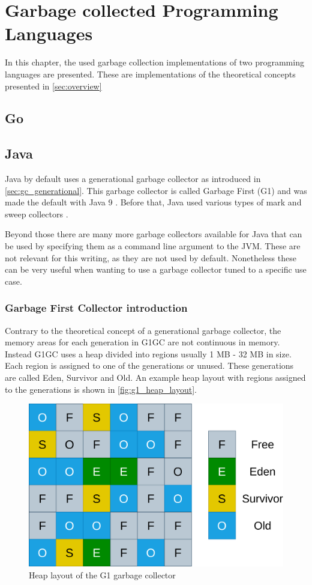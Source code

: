 \chapter{Garbage collected Programming Languages}

In this chapter, the used garbage collection implementations of two programming
languages are presented. These are implementations of the theoretical concepts
presented in \autoref{sec:overview}

\section{Go}
\section{Java}

Java by default uses a generational garbage collector as introduced in \autoref{sec:gc_generational}.
This garbage collector is called Garbage First (G1) and was made the default with Java 9 \cite{java_gc_comparison_2018}.
Before that, Java used various types of mark and sweep collectors \cite{java_available_gcs}.

Beyond those there are many more garbage collectors available for Java that can
be used by specifying them as a command line argument to the JVM.
These are not relevant for this writing, as they are not used by default.
Nonetheless these can be very useful when wanting to use a garbage collector
tuned to a specific use case.

\subsection{Garbage First Collector introduction}

Contrary to the theoretical concept of a generational garbage collector,
the memory areas for each generation in G1GC are not continuous in memory.
Instead G1GC uses a heap divided into regions usually 1 MB - 32 MB in size.
Each region is assigned to one of the generations or unused.
These generations are called Eden, Survivor and Old. \cite{java_g1_getting_started}
An example heap layout with regions assigned to the generations is shown in \autoref{fig:g1_heap_layout}.

\begin{figure}[htbp]
    \centering
    \includegraphics[width=.7\textwidth]{images/G1_Heap_Layout.drawio.png}
    \caption{Heap layout of the G1 garbage collector}
    \label{fig:g1_heap_layout}
\end{figure}

